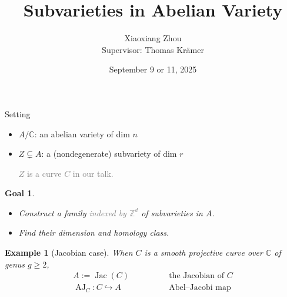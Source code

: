 \documentclass[pdf]{beamer}
\title{Subvarieties in Abelian Variety}
\author[Xiaoxiang Zhou]{Xiaoxiang Zhou\\[10mm]{\small Supervisor: Thomas Krämer
}}
\institute[HU berlin]{Humboldt-Universität zu Berlin}
\date{September 9 or 11, 2025}
\numberwithin{equation}{section}
\theoremstyle{plain}
\newtheorem{eg}[theorem]{Example}
\newtheorem{goal}[theorem]{Goal}
\theoremstyle{plain}
\theoremstyle{remark}
\newtheorem{short}{ }
\newcommand*{\ignore}[1]{\textcolor{gray}{#1}}
\DeclareMathOperator{\Jac}{\operatorname{Jac}}
\DeclareMathOperator{\AJ}{\operatorname{AJ}}
\begin{document}
\begin{frame}
	\titlepage
\end{frame}

\begin{frame}[fragile]
\begin{overlayarea}{\textwidth}{8cm}
\begin{block}{Setting}
\begin{itemize}
	\item $A/\mathbb{C}$: an abelian variety of dim $n$
	\item $Z \subsetneq A$: a (nondegenerate) subvariety of dim $r$

\ignore{$Z$ is a curve $C$ in our talk.}
	
\end{itemize}
\end{block}


%	
{
\vspace{10mm}
\begin{goal}
\begin{itemize}
	\item Construct a family \ignore{indexed by $\mathbb{Z}^d$} of subvarieties in $A$.
	\item Find their dimension and homology class.
	
\end{itemize}
\end{goal}
}

{
\vspace{5mm}
\begin{eg}[Jacobian case]
When $C$ is a smooth projective curve over $\mathbb{C}$ of genus $g \geqslant 2$, 
\begin{equation*}
\begin{aligned}
 A:=\Jac(C) &\qquad\qquad \text{the Jacobian of $C$}  \\ 
 \AJ_C:C \hookrightarrow A &\qquad\qquad \text{Abel--Jacobi map}
\end{aligned}
\end{equation*}
\end{eg}
}


\end{overlayarea}
\end{frame}
\end{document}

